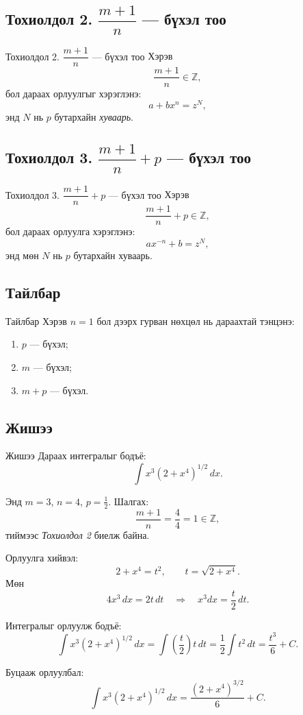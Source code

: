 \subsection*{Тохиолдол 2. $\dfrac{m+1}{n}$ — бүхэл тоо}
\begin{frame}[allowframebreaks]{Тохиолдол 2. $\dfrac{m+1}{n}$ — бүхэл тоо}
Хэрэв
\[
\frac{m+1}{n}\in\mathbb{Z},
\]
бол дараах орлуулгыг хэрэглэнэ:
\[
a + b x^{n} = z^{N},
\]
энд $N$ нь $p$ бутархайн \emph{хуваарь}.
\end{frame}

\subsection*{Тохиолдол 3. $\dfrac{m+1}{n}+p$ — бүхэл тоо}
\begin{frame}[allowframebreaks]{Тохиолдол 3. $\dfrac{m+1}{n}+p$ — бүхэл тоо}
Хэрэв
\[
\frac{m+1}{n} + p \in \mathbb{Z},
\]
бол дараах орлуулга хэрэглэнэ:
\[
a x^{-n} + b = z^{N},
\]
энд мөн $N$ нь $p$ бутархайн хуваарь.
\end{frame}

\subsection*{Тайлбар}
\begin{frame}[allowframebreaks]{Тайлбар}
Хэрэв $n=1$ бол дээрх гурван нөхцөл нь дараахтай тэнцэнэ:
\begin{enumerate}
\item $p$ — бүхэл;
\item $m$ — бүхэл;
\item $m+p$ — бүхэл.
\end{enumerate}
\end{frame}

\subsection*{Жишээ}
\begin{frame}[allowframebreaks]{Жишээ}
Дараах интегралыг бодъё:
\[
\int x^3(2+x^4)^{1/2}\,dx.
\]

Энд $m=3$, $n=4$, $p=\frac12$. Шалгах:
\[
\frac{m+1}{n} = \frac{4}{4} = 1 \in \mathbb{Z},
\]
тиймээс \emph{Тохиолдол 2} биелж байна.

Орлуулга хийвэл:
\[
2 + x^4 = t^2, \qquad t = \sqrt{2+x^4}.
\]
Мөн
\[
4x^3\,dx = 2t\,dt \quad\Rightarrow\quad x^3dx = \frac{t}{2}\,dt.
\]

Интегралыг орлуулж бодъё:
\[
\int x^3(2+x^4)^{1/2}\,dx
= \int \left( \frac{t}{2}\right)t\,dt
= \frac12\int t^2 \, dt
= \frac{t^3}{6} + C.
\]

Буцааж орлуулбал:
\[
\boxed{
\int x^3(2+x^4)^{1/2}\,dx
= \frac{(2+x^4)^{3/2}}{6} + C.
}
\]
\end{frame}


